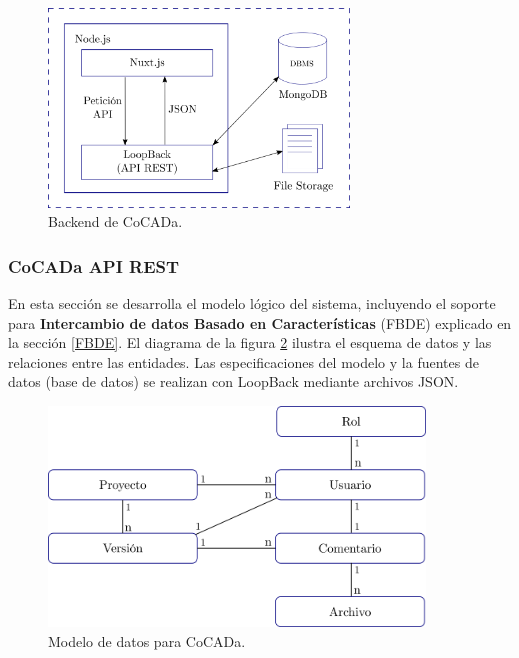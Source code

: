 
\begin{figure}[h]
    \includegraphics[width=8cm]{Img/Desarrollo/backendf.png}
    \centering
    \caption{\footnotesize{Backend de CoCADa.}}
     \label{fig:sistema0}
\end{figure}

\subsubsection{CoCADa API REST}
En esta sección se desarrolla el modelo lógico del sistema, incluyendo el soporte para \textbf{Intercambio de datos Basado en Características} (FBDE) explicado en la sección \ref{FBDE}. El diagrama de la figura \ref{fig:schema} ilustra el esquema de datos y las relaciones entre las entidades. Las especificaciones del modelo y la fuentes de datos (base de datos) se realizan con LoopBack mediante archivos JSON.



\begin{figure}[h]
    \includegraphics[width=10cm]{Img/Desarrollo/cocada-de0.png}
    \centering
    \caption{\footnotesize{Modelo de datos para CoCADa.}  }
    \label{fig:schema}
\end{figure}

